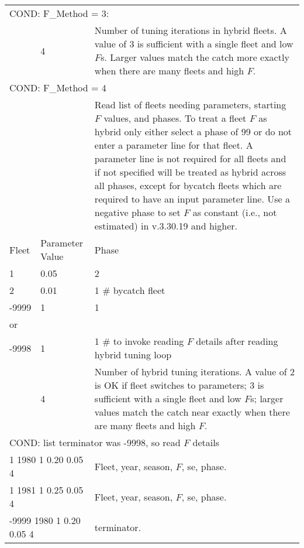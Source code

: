 \begin{longtable}{p{1cm} p{3cm} p{11cm}}
	\multicolumn{3}{l}{COND: F\_Method = 3:} \Tstrut\\
	& 4 & Number of tuning iterations in hybrid fleets. A value of 3 is sufficient with a single fleet and low $F$s. Larger values match the catch more exactly when there are many fleets and high $F$. \Bstrut\\
	\hline
	
	\multicolumn{3}{l}{COND: F\_Method = 4} \Tstrut\\
	& & Read list of fleets needing parameters, starting $F$ values, and phases. To treat a fleet $F$ as hybrid only either select a phase of 99 or do not enter a parameter line for that fleet. A parameter line is not required for all fleets and if not specified will be treated as hybrid across all phases, except for bycatch fleets which are required to have an input parameter line. Use a negative phase to set $F$ as constant (i.e., not estimated) in v.3.30.19 and higher. \Tstrut\\
	Fleet & Parameter Value & Phase \Tstrut\\
	1 & 0.05 & 2 \\
	2 & 0.01 & 1 \# bycatch fleet \\
	-9999 & 1 & 1 \Bstrut\\
	or & & \\
	-9998 & 1 & 1 \# to invoke reading $F$ details after reading hybrid tuning loop \Bstrut\\
 
	& 4 & Number of hybrid tuning iterations. A value of 2 is OK if fleet switches to parameters; 3 is sufficient with a single fleet and low $F$s; larger values match the catch near exactly when there are many fleets and high $F$. \Tstrut\Bstrut\\

	\hline
	\multicolumn{3}{l}{COND: list terminator was -9998, so read $F$ details } \Tstrut\\
	\multicolumn{2}{l}{1 1980 1 0.20 0.05 4} & Fleet, year, season, $F$, \gls{se}, phase. \Bstrut\\
	\multicolumn{2}{l}{1 1981 1 0.25 0.05 4} & Fleet, year, season, $F$, \gls{se}, phase. \Bstrut\\
	\multicolumn{2}{l}{-9999 1980 1 0.20 0.05 4} & terminator. \Bstrut\\
	\hline

\end{longtable}

\hypertarget{EquilSPR}{}

